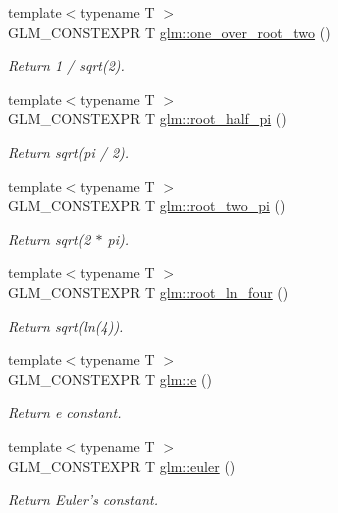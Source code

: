 \begin{DoxyCompactItemize}
{\footnotesize template$<$typename T $>$ }\\G\-L\-M\-\_\-\-C\-O\-N\-S\-T\-E\-X\-P\-R T \hyperlink{group__gtc__constants_ga109c0c04ce9f7912254bb52800d22344}{glm\-::one\-\_\-over\-\_\-root\-\_\-two} ()
\begin{DoxyCompactList}\small\item\em Return 1 / sqrt(2). \end{DoxyCompactList}\item 
{\footnotesize template$<$typename T $>$ }\\G\-L\-M\-\_\-\-C\-O\-N\-S\-T\-E\-X\-P\-R T \hyperlink{group__gtc__constants_gad0cd42ca5c54d9896654b3048a4ef0d7}{glm\-::root\-\_\-half\-\_\-pi} ()
\begin{DoxyCompactList}\small\item\em Return sqrt(pi / 2). \end{DoxyCompactList}\item 
{\footnotesize template$<$typename T $>$ }\\G\-L\-M\-\_\-\-C\-O\-N\-S\-T\-E\-X\-P\-R T \hyperlink{group__gtc__constants_ga388e713e3a29840079d2dd1128f46166}{glm\-::root\-\_\-two\-\_\-pi} ()
\begin{DoxyCompactList}\small\item\em Return sqrt(2 $\ast$ pi). \end{DoxyCompactList}\item 
{\footnotesize template$<$typename T $>$ }\\G\-L\-M\-\_\-\-C\-O\-N\-S\-T\-E\-X\-P\-R T \hyperlink{group__gtc__constants_gacce3e8846a876b339812dd7279b3d929}{glm\-::root\-\_\-ln\-\_\-four} ()
\begin{DoxyCompactList}\small\item\em Return sqrt(ln(4)). \end{DoxyCompactList}\item 
{\footnotesize template$<$typename T $>$ }\\G\-L\-M\-\_\-\-C\-O\-N\-S\-T\-E\-X\-P\-R T \hyperlink{group__gtc__constants_ga1cebaa574cc7c9018ccefbde3f174db5}{glm\-::e} ()
\begin{DoxyCompactList}\small\item\em Return e constant. \end{DoxyCompactList}\item 
{\footnotesize template$<$typename T $>$ }\\G\-L\-M\-\_\-\-C\-O\-N\-S\-T\-E\-X\-P\-R T \hyperlink{group__gtc__constants_gaed1d93869801afa40958ffa062dde245}{glm\-::euler} ()
\begin{DoxyCompactList}\small\item\em Return Euler's constant. \end{DoxyCompactList}\item 

\end{DoxyCompactItemize}
